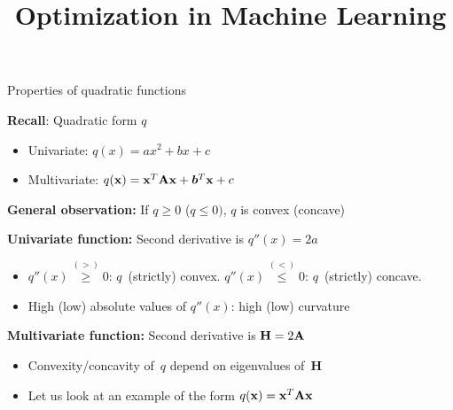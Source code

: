 \documentclass[11pt,compress,t,notes=noshow, xcolor=table]{beamer}
\title{Optimization in Machine Learning}
\date{}
\begin{document}
\sloppy


\begin{vbframe}{Properties of quadratic functions}

\vspace{-\baselineskip}

\begin{kframe}
    \textbf{Recall}: Quadratic form $q$
    \begin{itemize}
        \item Univariate: $q(x) = ax^2 + bx + c$
        \item Multivariate: $q(\mathbf{x}) = \mathbf{x}^T \mathbf{A} \mathbf{x} + \bm{b}^T \mathbf{x} + c$
    \end{itemize}
\end{kframe}

\textbf{General observation:} If $q\geq0$ ($q\leq0)$, $q$ is convex (concave)

\lz

\textbf{Univariate function:} Second derivative is $q''(x) = 2a$

\begin{itemize}
    \item $q''(x) \overset{(>)}{\geq} 0$: $q$~(strictly) convex. 
        $q''(x) \overset{(<)}{\leq} 0$: $q$~(strictly) concave.
    \item High (low) absolute values of $q''(x)$: high (low) curvature
\end{itemize}

\lz

\textbf{Multivariate function:} Second derivative is $\mathbf{H}=2\mathbf{A}$

\begin{itemize}
    \item Convexity/concavity of~$q$ depend on eigenvalues of~$\mathbf{H}$
    \item Let us look at an example of the form $q(\mathbf{x}) = \mathbf{x}^T\mathbf{A}\mathbf{x}$
\end{itemize}

\end{vbframe}
  
\end{document}
